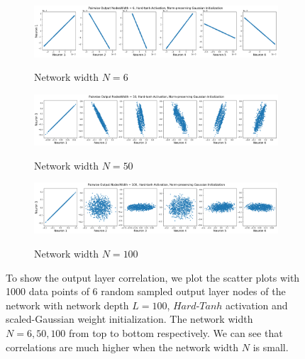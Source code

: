 \begin{figure}
\centering
\newcommand{\myWidth}{.9\textwidth}
\begin{subfigure}{\myWidth}
  \centering
  \caption{Network width $N=6$}
  \includegraphics[width=1.0\linewidth,trim={0 0 0 0.8cm},clip]{InitialCorrelation - HardTanhWidth6}
  \label{fig:sec4_sim1_a}
\end{subfigure}%

\begin{subfigure}{\myWidth}
  \centering
  \caption{Network width $N=50$}
  \includegraphics[width=1.0\linewidth,trim={0 0 0 0.8cm},clip]{InitialCorrelation - HardTanhWidth50}
  \label{fig:sec4_sim1_b}
\end{subfigure}%

\begin{subfigure}{\myWidth}
  \centering
  \caption{Network width $N=100$}
  \includegraphics[width=1.0\linewidth,trim={0 0 0 0.8cm},clip]{InitialCorrelation - HardTanhWidth100}
  \label{fig:sec4_sim1_c}
\end{subfigure}%

\caption{To show the output layer correlation, we plot the scatter plots with 1000 data points of 6 random sampled output layer nodes of the network with network depth $L=100$, $Hard\text{-}Tanh$ activation and scaled-Gaussian weight initialization. The network width $N=6, 50, 100$ from top to bottom respectively. We can see that correlations are much higher when the network width $N$ is small.}
\label{fig:sec4_sim1}
\end{figure}